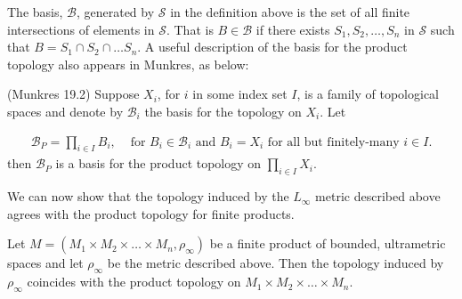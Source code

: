  The basis, $\mathcal{B}$, generated by $\mathcal{S}$ in the definition above is the set of all finite intersections of elements in $\mathcal{S}$. That is $B \in \mathcal{B}$ if there exists $S_1, S_2, \ldots, S_n$ in $\mathcal{S}$ such that $B = S_1 \cap S_2 \cap \ldots S_n$.  A useful description of the basis for the product topology also appears in Munkres, as below:

\begin{proposition*} (Munkres 19.2)
Suppose $X_i$, for $i$ in some index set $I$, is a family of topological spaces and denote by $\mathcal{B}_i$ the basis for the topology on $X_i$. Let 

\begin{align*}
\mathcal{B}_P = \prod_{i \in I} B_i, & \text{ for }  B_i \in \mathcal{B}_i \text { and } B_i = X_i \text{ for all but finitely-many } i \in I. 
\end{align*}
then $\mathcal{B}_P$ is a basis for the product topology on $\prod_{i \in I} X_i$.\\

\end{proposition*}

We can now show that the topology induced by the $L_\infty$ metric described above agrees with the product topology for finite products.

\begin{proposition*}
Let $M=(M_{1} \times M_{2} \times \ldots \times M_{n},\rho_\infty)$ be a finite product of bounded, ultrametric spaces and let $\rho_\infty$ be the metric described above.  Then the topology induced by $\rho_\infty$ coincides with the product topology on $M_{1} \times M_{2} \times \ldots \times M_{n}$.
\end{proposition*}

